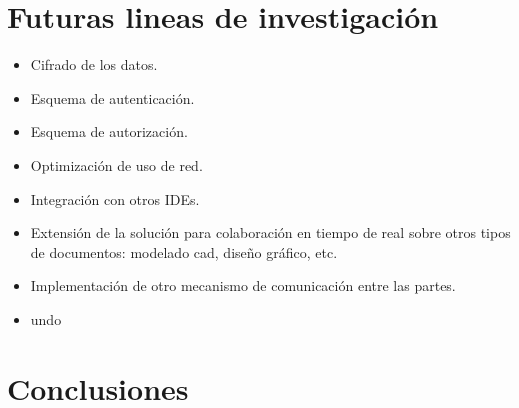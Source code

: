\documentclass[12pt,a4paper]{article}
\begin{document}
\section{Futuras lineas de investigación}

\begin{itemize}
	\item Cifrado de los datos.
	\item Esquema de autenticación.
	\item Esquema de autorización.
	\item Optimización de uso de red.
	\item Integración con otros IDEs.
	\item Extensión de la solución para colaboración en tiempo de real sobre otros tipos de documentos: modelado cad,
	diseño gráfico, etc.
	\item Implementación de otro mecanismo de comunicación entre las partes.
	\item undo
\end{itemize}

\section{Conclusiones}
\end{document}
